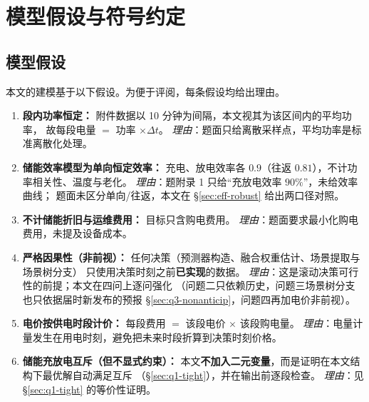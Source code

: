 \section{模型假设与符号约定}

\subsection{模型假设}

本文的建模基于以下假设。为便于评阅，每条假设均给出理由。

\begin{enumerate}[label=\textbf{A\arabic*.},itemsep=4pt,topsep=4pt,leftmargin=*]
  \item \textbf{段内功率恒定：}
        附件数据以 10 分钟为间隔，本文视其为该区间内的平均功率，
        故每段电量 $=$ 功率 $\times \Delta t$。
        \emph{理由}：题面只给离散采样点，平均功率是标准离散化处理。

  \item \textbf{储能效率模型为单向恒定效率：}
        充电、放电效率各 $0.9$（往返 $0.81$），不计功率相关性、温度与老化。
        \emph{理由}：题附录 1 只给“充放电效率 $90\%$”，未给效率曲线；
        题面未区分单向/往返，本文在 \S\ref{sec:eff-robust} 给出两口径对照。

  \item \textbf{不计储能折旧与运维费用：}
        目标只含购电费用。
        \emph{理由}：题面要求最小化购电费用，未提及设备成本。

  \item \textbf{严格因果性（非前视）：}
        任何决策（预测器构造、融合权重估计、场景提取与场景树分支）
        只使用决策时刻之前\textbf{已实现}的数据。
        \emph{理由}：这是滚动决策可行性的前提；本文在四问上逐问强化
        （问题二只依赖历史，问题三场景树分支也只依据届时新发布的预报
        \S\ref{sec:q3-nonanticip}，问题四再加电价非前视）。

  \item \textbf{电价按供电时段计价：}
        每段费用 $=$ 该段电价 $\times$ 该段购电量。
        \emph{理由}：电量计量发生在用电时刻，避免把未来时段折算到决策时刻价格。

  \item \textbf{储能充放电互斥（但不显式约束）：}
        本文\textbf{不加入二元变量}，而是证明在本文结构下最优解自动满足互斥
        （\S\ref{sec:q1-tight}），并在输出前逐段检查。
        \emph{理由}：见 \S\ref{sec:q1-tight} 的等价性证明。
\end{enumerate}

